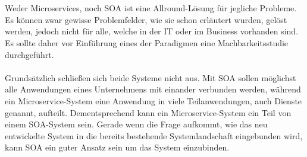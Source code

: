 \\\\
Weder Microservices, noch SOA ist eine Allround-Lösung für jegliche Probleme. Es können zwar gewisse Problemfelder, wie sie schon erläutert wurden, gelöst werden, jedoch nicht für alle, welche in der IT oder im Business vorhanden sind. Es sollte daher vor Einführung eines der Paradigmen eine Machbarkeitsstudie durchgeführt.
\\\\
Grundsätzlich schließen sich beide Systeme nicht aus. Mit SOA sollen möglichst alle Anwendungen eines Unternehmens mit einander verbunden werden, während ein Microservice-System eine Anwendung in viele Teilanwendungen, auch Dienste genannt, aufteilt. Dementsprechend kann ein Microservice-System ein Teil von einem SOA-System sein. Gerade wenn die Frage aufkommt, wie das neu entwickelte System in die bereits bestehende Systemlandschaft eingebunden wird, kann SOA ein guter Ansatz sein um das System einzubinden.